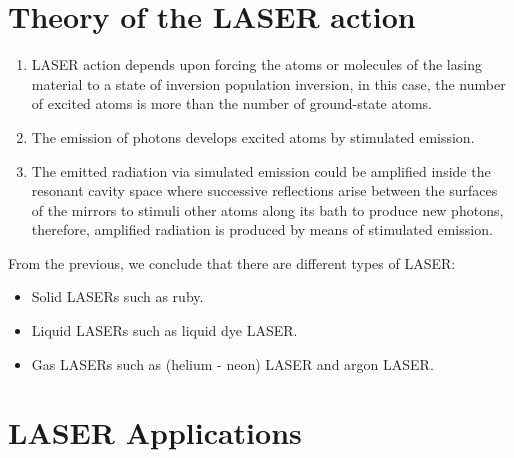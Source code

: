 \documentclass[a4paper,12pt]{article}
\begin{document}
\section{Theory of the LASER action}
\begin{enumerate}
    \item LASER action depends upon forcing the atoms or molecules of the lasing material to a state of inversion population inversion, in this case, the number of excited atoms is more than the number of ground-state atoms.
    \item The emission of photons develops excited atoms by stimulated emission.
    \item The emitted radiation via simulated emission could be amplified inside the resonant cavity space where successive reflections arise between the surfaces of the mirrors to stimuli other atoms along its bath to produce new photons, therefore, amplified radiation is produced by means of stimulated emission.
\end{enumerate}
From the previous, we conclude that there are different types of LASER:
\begin{itemize}
    \item Solid LASERs such as ruby.
    \item Liquid LASERs such as liquid dye LASER.
    \item Gas LASERs such as (helium - neon) LASER and argon LASER.
\end{itemize}
 
\section{LASER Applications}
\end{document}
